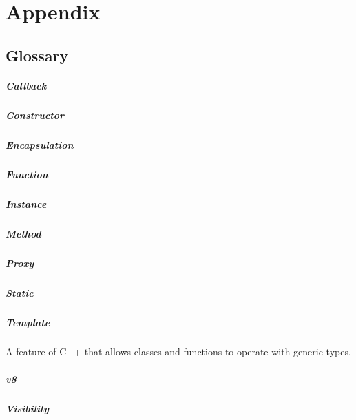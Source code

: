 \chapter{Appendix}


\section{Glossary}
\paragraph{Callback}
\paragraph{Constructor}
\paragraph{Encapsulation}
\paragraph{Function}
\paragraph{Instance}
\paragraph{Method}
\paragraph{Proxy}
\paragraph{Static}
\paragraph{Template} 
A feature of C++ that allows classes and functions to operate with generic types.
\paragraph{v8}
\paragraph{Visibility}

